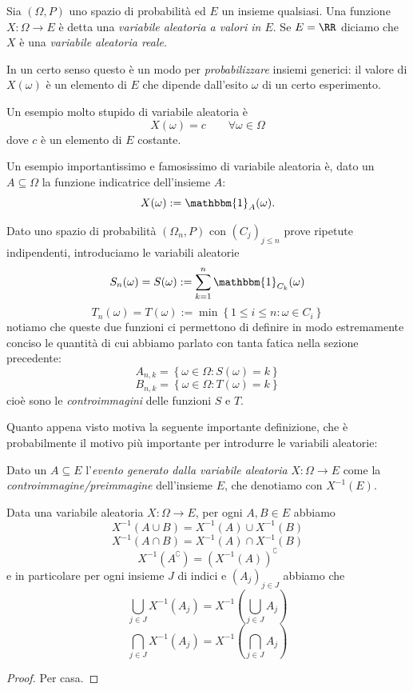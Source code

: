 \documentclass[11pt]{scrartcl}
\begin{document}
	\begin{definition}
		Sia $(\Omega,P)$ uno spazio di probabilità ed $E$ un insieme qualsiasi. Una funzione $X:\Omega\to E$ è detta una \textit{variabile aleatoria a valori in $E$}. Se $E=\RR$ diciamo che $X$ è una \textit{variabile aleatoria reale}. 
	\end{definition}
	In un certo senso questo è un modo per \textit{probabilizzare} insiemi generici: il valore di $X(\omega)$ è un elemento di $E$ che dipende dall'esito $\omega$ di un certo esperimento. 
	\begin{example}
		Un esempio molto stupido di variabile aleatoria è
		$$X(\omega)=c \qquad \forall \omega\in \Omega$$
		dove $c$ è un elemento di $E$ costante.
	\end{example}
	\begin{example}
		Un esempio importantissimo e famosissimo di variabile aleatoria è, dato un $A\subseteq \Omega$ la funzione indicatrice dell'insieme $A$:
		$$X(\omega):=\mathbbm{1}_A(\omega).$$
	\end{example}
	\begin{example}
		Dato uno spazio di probabilità $(\Omega_n,P)$ con $\left(C_j\right)_{j\le n}$ prove ripetute indipendenti, introduciamo le variabili aleatorie
		$$S_n(\omega)=S(\omega):=\sum_{k=1}^{n}\mathbbm{1}_{C_k}(\omega)$$
		$$T_n(\omega)=T(\omega):=\min\left\{1\le i\le n: \omega \in C_i\right\}$$
		notiamo che queste due funzioni ci permettono di definire in modo estremamente conciso le quantità di cui abbiamo parlato con tanta fatica nella sezione precedente:
		$$A_{n,k}=\left\{\omega\in \Omega: S(\omega)=k\right\}$$
		$$B_{n,k}=\left\{\omega\in \Omega: T(\omega)=k\right\}$$
		cioè sono le \textit{controimmagini} delle funzioni $S$ e $T$.
	\end{example}
	Quanto appena visto motiva la seguente importante definizione, che è probabilmente il motivo più importante per introdurre le variabili aleatorie:
	\begin{definition}
		Dato un $A\subseteq E$ l'\textit{evento generato dalla variabile aleatoria} $X:\Omega\to E$ come la \textit{controimmagine/preimmagine} dell'insieme $E$, che denotiamo con $X^{-1}(E)$.
	\end{definition}
	\begin{lemma}
		Data una variabile aleatoria $X:\Omega\to E$, per ogni $A,B\in E$ abbiamo
		$$X^{-1}\left(A\cup B\right)=X^{-1}\left(A\right)\cup X^{-1}\left(B\right)$$
		$$X^{-1}\left(A\cap B\right)=X^{-1}\left(A\right)\cap X^{-1}\left(B\right)$$
		$$X^{-1}\left(A^\complement\right)=\left(X^{-1}(A)\right)^\complement$$
		e in particolare per ogni insieme $J$ di indici e $\left(A_j\right)_{j\in J}$ abbiamo che
		$$\bigcup_{j\in J} X^{-1}(A_j)=X^{-1}\!\left(\bigcup_{j\in J} A_j\right)$$
		$$\bigcap_{j\in J} X^{-1}(A_j)=X^{-1}\!\left(\bigcap_{j\in J} A_j\right)$$
	\end{lemma}
	\begin{proof}
		Per casa.
	\end{proof}
\end{document}
